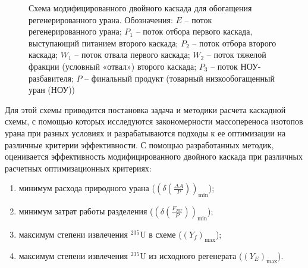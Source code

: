 \begin{figure}[ht]
  \caption{Схема модифицированного двойного каскада для обогащения регенерированного урана. Обозначения: $E$ -- поток регенерированного урана; $P_1$ -- поток отбора первого каскада, выступающий питанием второго каскада; $P_2$ -- поток отбора второго каскада; $W_1$ -- поток отвала первого каскада; $W_2$ -- поток тяжелой фракции (условный «отвал») второго каскада; $P_3$ -- поток НОУ-разбавителя; $P$ -- финальный продукт (товарный низкообогащенный уран (НОУ))}\label{p2left_autoref}
\end{figure}

Для этой схемы приводится постановка задача и методики расчета каскадной схемы, с помощью которых исследуются закономерности массопереноса изотопов урана при разных условиях и разрабатываются подходы к ее оптимизации на различные критерии эффективности. С помощью разработанных методик, оценивается эффективность модифицированного двойного каскада при различных расчетных оптимизационных критериях:
\begin{enumerate}
  \item минимум расхода природного урана ($(\delta(\frac{\Delta A}{P}))_\text{min}$);
  \item минимум затрат работы разделения ($(\delta(\frac{F_{NU}}{P}))_\text{min}$);
  \item максимум степени извлечения $^{235}$U в схеме ($(Y_f)_\text{max}$);
  \item максимум степени извлечения $^{235}$U из исходного регенерата ($(Y_{E})_\text{max}$).
\end{enumerate}  

